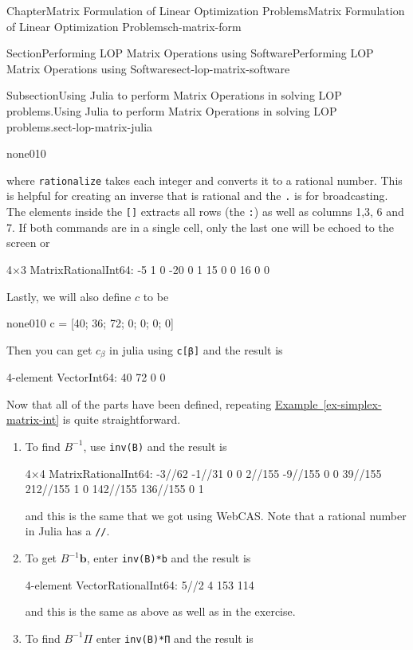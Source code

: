 \documentclass[oneside,10pt,]{book}
\newcommand{\xreffont}{\relax}
\newcommand{\mono}[1]{\texttt{#1}}
\numberwithin{equation}{section}
\begin{document}
\begin{chapterptx}{Chapter}{Matrix Formulation of Linear Optimization Problems}{}{Matrix Formulation of Linear Optimization Problems}{}{}{ch-matrix-form}
\begin{sectionptx}{Section}{Performing LOP Matrix Operations using Software}{}{Performing LOP Matrix Operations using Software}{}{}{sect-lop-matrix-software}
\begin{subsectionptx}{Subsection}{Using Julia to perform Matrix Operations in solving LOP problems.}{}{Using Julia to perform Matrix Operations in solving LOP problems.}{}{}{sect-lop-matrix-julia}
\begin{program}{none}{0}{1}{0}
\end{program}
where \mono{rationalize} takes each integer and converts it to a rational number. This is helpful for creating an inverse that is rational and the \mono{.} is for broadcasting. The elements inside the \mono{[]} extracts all rows (the \mono{:}) as well as columns 1,3, 6 and 7. If both commands are in a single cell, only the last one will be echoed to the screen or%
\par
%
\begin{codedisplay}
4×3 Matrix{Rational{Int64}}:
  -5  1  0
 -20  0  1
  15  0  0
  16  0  0
\end{codedisplay}
%
\par
Lastly, we will also define \(c\) to be%
\begin{program}{none}{0}{1}{0}
c = [40; 36; 72; 0; 0; 0; 0]
\end{program}
Then you can get \(c_{\beta}\) in julia using \mono{c[β]} and the result is%
\par
%
\begin{codedisplay}
4-element Vector{Int64}:
 40
 72
  0
  0
\end{codedisplay}
%
\par
Now that all of the parts have been defined, repeating \hyperref[ex-simplex-matrix-int]{Example~{\xreffont\ref{ex-simplex-matrix-int}}} is quite straightforward.%
\par
%
\begin{enumerate}
\item{}To find \(B^{-1}\), use \mono{inv(B)} and the result is%
\par
%
\begin{codedisplay}
4×4 Matrix{Rational{Int64}}:
  -3//62    -1//31   0  0
   2//155   -9//155  0  0
  39//155  212//155  1  0
 142//155  136//155  0  1
\end{codedisplay}
%
\par
and this is the same that we got using WebCAS. Note that a rational number in Julia has a \mono{//}.%
\item{}To get \(B^{-1}\boldsymbol{b}\), enter \mono{inv(B)*b} and the result is%
\par
%
\begin{codedisplay}
4-element Vector{Rational{Int64}}:
  5//2
   4
 153
 114
\end{codedisplay}
%
\par
and this is the same as above as well as in the exercise.%
\item{}To find \(B^{-1}\Pi\) enter \mono{inv(B)*Π} and the result is%

\end{enumerate}
\end{subsectionptx}
\end{sectionptx}
\end{chapterptx}
\end{document}
